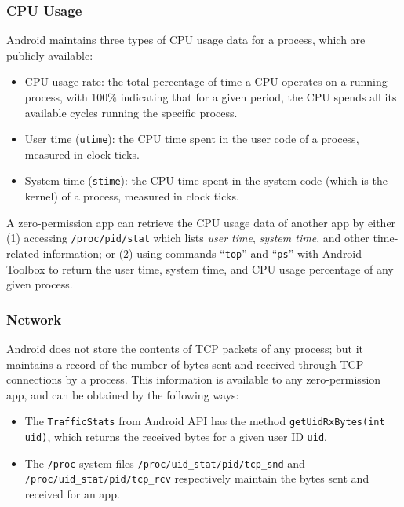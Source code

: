 \documentclass[letterpaper,12pt]{article}
\begin{document}
\subsubsection{CPU Usage}
Android maintains three types of CPU usage data for a process, which are publicly available:
%
\begin{itemize}
\item CPU usage rate: the total percentage of time a
  CPU operates on a running process, with 100\% indicating that for a given period,
  the CPU spends all its available cycles running the specific process.

\item User time (\texttt{utime}): the CPU time spent in the user code of a process, measured in clock ticks.

\item System time (\texttt{stime}): the CPU time spent in the system code (which is
  the kernel) of a process, measured in clock ticks.

\end{itemize}

A zero-permission app can retrieve the CPU usage data of
another app by either (1) accessing \texttt{/proc/pid/stat} which lists
\textit{user time}, \textit{system time}, and other time-related information; or
(2) using commands ``\texttt{top}'' and ``\texttt{ps}'' with Android
Toolbox to return the user time, system time, and CPU usage percentage
of any given process.

\subsubsection{Network}
Android does not store the contents of TCP packets of any
process; but it maintains a record of the number of bytes sent and received through TCP connections by a process. This information is available to any
zero-permission app, and can be obtained by the following
ways:
\begin{itemize}
\item The \texttt{TrafficStats} from Android API has the method
  \texttt{getUidRxBytes(int uid)}, which returns the received bytes for a
  given user ID \texttt{uid}.

\item The \texttt{/proc} system files
  \texttt{/proc/uid\_stat/pid/tcp\_snd} and \\
  \texttt{/proc/uid\_stat/pid/tcp\_rcv} respectively maintain the bytes sent and
  received for an app.
\end{itemize}
\end{document}
